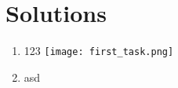 \documentclass{article}
\begin{document}

\section*{Solutions}
\begin{enumerate}
        \item 123 \makebox[0pt][l]{}
        \texttt{[image: first\_task.png]} 
    
        \item asd
\end{enumerate}
\end{document}
